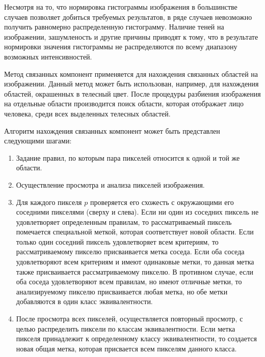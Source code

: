 
Несмотря на то, что нормировка гистограммы изображения в большинстве случаев позволяет добиться требуемых результатов, в ряде случаев невозможно получить равномерно распределенную гистограмму. Наличие теней на изображении, зашумленость и другие причины приводят к тому, что в результате нормировки значения гистограммы не распределяются по всему диапазону возможных интенсивностей.


Метод связанных компонент применяется для нахождения связанных областей на изображении. Данный метод может быть использован, например, для нахождения областей, окрашенных в телесный цвет. После процедуры разбиения изображения на отдельные области производится поиск области, которая отображает лицо человека, среди всех выделенных телесных областей.

Алгоритм нахождения связанных компонент может быть представлен следующими шагами:

\begin{enumerate}
	\item Задание правил, по которым пара пикселей относится к одной и той же области.
	\item Осуществление просмотра и анализа пикселей изображения.
	\item Для каждого пикселя $p$ проверяется его схожесть с окружающими его соседними пикселями (сверху и слева). Если ни один из соседних пиксель не удовлетворяет определенным правилам, то рассматриваемый пиксель помечается специальной меткой, которая соответствует новой области. Если только один соседний пиксель удовлетворяет всем критериям, то рассматриваемому пикселю присваивается метка соседа. Если оба соседа удовлетворяют всем критериям и имеют одинаковые метки, то данная метка также присваивается рассматриваемому пикселю. В противном случае, если оба соседа удовлетворяют всем правилам, но имеют отличные метки, то анализируемому пикселю присваивается любая метка, но обе метки добавляются в один класс эквивалентности. 
	\item После просмотра всех пикселей, осуществляется повторный просмотр, с целью распределить пиксели по классам эквивалентности. Если метка пикселя принадлежит к определенному классу эквивалентности, то создается новая общая метка, которая присвается всем пикселям данного класса.
\end{enumerate}

